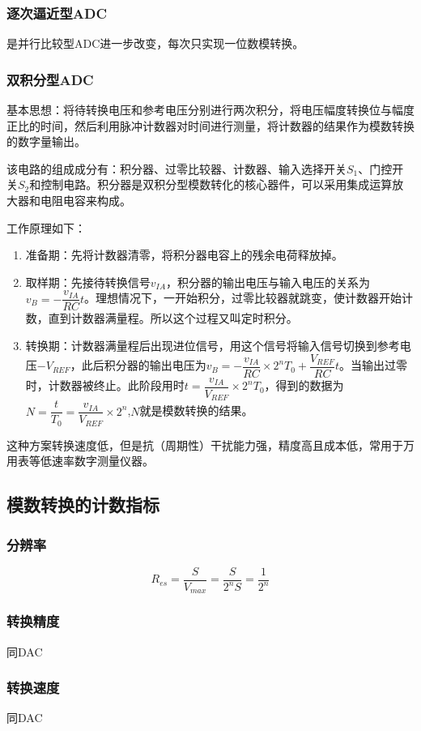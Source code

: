 \documentclass{ctexart}
\begin{document}
\subsubsection{逐次逼近型ADC}
是并行比较型ADC进一步改变，每次只实现一位数模转换。{\color{red}{对n位模数转换，需要(n+1)个时钟周期（多的一个周期用于输出）}}
\subsubsection{双积分型ADC}
基本思想：将待转换电压和参考电压分别进行两次积分，将电压幅度转换位与幅度正比的时间，然后利用脉冲计数器对时间进行测量，将计数器的结果作为模数转换的数字量输出。

该电路的组成成分有：积分器、过零比较器、计数器、输入选择开关$S_1$、门控开关$S_2$和控制电路。积分器是双积分型模数转化的核心器件，可以采用集成运算放大器和电阻电容来构成。

工作原理如下：
\begin{enumerate}
    \item 准备期：先将计数器清零，将积分器电容上的残余电荷释放掉。
    \item 取样期：先接待转换信号$v_{IA}$，积分器的输出电压与输入电压的关系为$v_B=-\dfrac{v_{IA}}{RC}t$。理想情况下，一开始积分，过零比较器就跳变，使计数器开始计数，直到计数器满量程。所以这个过程又叫定时积分。
    \item 转换期：计数器满量程后出现进位信号，用这个信号将输入信号切换到参考电压$-V_{REF}$，此后积分器的输出电压为$v_B=-\dfrac{v_{IA}}{RC}\times 2^n T_0+\dfrac{V_{REF}}{RC}t$。当输出过零时，计数器被终止。此阶段用时$t=\dfrac{v_{IA}}{V_{REF}}\times 2^n T_0$，得到的数据为$N=\dfrac{t}{T_0}=\dfrac{v_{IA}}{V_{REF}}\times 2^n$,$N$就是模数转换的结果。
\end{enumerate}
{\color{red}{注意：参考电压要取负值，且其绝对值要大于待转换电压。}}

这种方案转换速度低，但是抗（周期性）干扰能力强，精度高且成本低，常用于万用表等低速率数字测量仪器。
\subsection{模数转换的计数指标}
\subsubsection{分辨率}
\begin{equation}
    R_{es}=\dfrac{S}{V_{max}}=\dfrac{S}{2^n S}=\dfrac{1}{2^n}
\end{equation}
\subsubsection{转换精度} 同DAC
\subsubsection{转换速度} 同DAC
\end{document}
